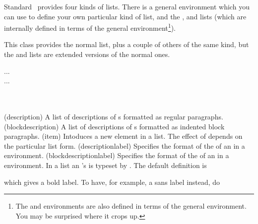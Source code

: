     Standard \ltx\ provides four kinds of lists. There is a general 
environment which you can use to define your own particular kind of list,
and the ,  and  lists (which are 
internally defined in terms of the general  
environment\footnote{The  and  environments are also
defined in terms of the general  environment. You may be 
surprised where it crops up.}).


    This class provides the normal  list, plus a couple of others 
of the same kind, but the  
and  lists are extended versions of the normal ones.

\begin{syntax}
 \cmd{\item} ...  \\
 \cmd{\item} ...  \\
\cmd{\descriptionlabel} \\
\cmd{\blockdescriptionlabel} \\
\end{syntax}
\glossary(description)%
  {}%
  {A list of descriptions of s formatted as regular paragraphs.}
\glossary(blockdescription)%
  {}%
  {A list of descriptions of s formatted as indented block paragraphs.}
\glossary(item)%
  {}%
  {Intoduces a new element in a list. The effect of  depends
   on the particular list form.}
\glossary(descriptionlabel)%
  {}%
  {Specifies the format of the  of an  in a 
    environment.}
\glossary(blockdescriptionlabel)%
  {}%
  {Specifies the format of the  of an  in a 
    environment.}
In a  list an 's  is typeset by
. The default definition is
\begin{lcode}
\newcommand*{\descriptionlabel}[1]{\hspace\labelsep
                                   \normalfont\bfseries #1}
\end{lcode}
which gives a bold label. To have, for example, a sans label instead, do
\begin{lcode}
\renewcommand*{\descriptionlabel}[1]{\hspace\labelsep
                                     \normalfont\sffamily #1}
\end{lcode}

